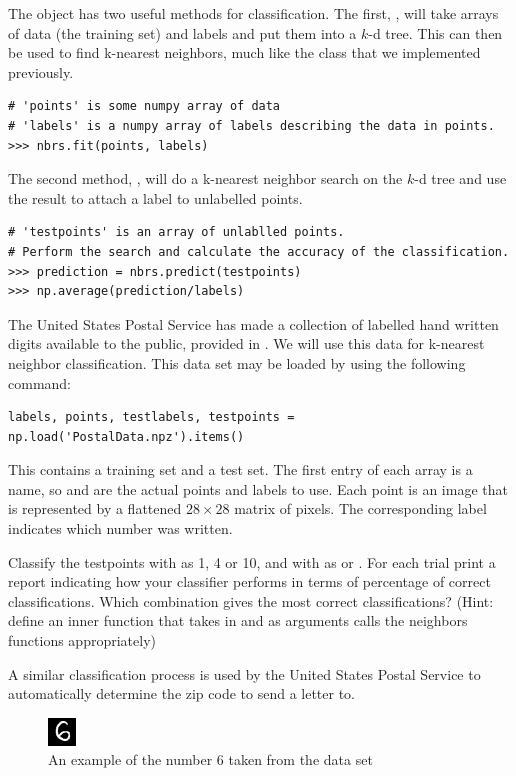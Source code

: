 The  object has two useful methods for classification.
The first, , will take arrays of data (the training set) and labels and put them into a $k$-d tree.
This can then be used to find k-nearest neighbors, much like the  class that we implemented previously.

\begin{lstlisting}
# 'points' is some numpy array of data
# 'labels' is a numpy array of labels describing the data in points.
>>> nbrs.fit(points, labels)
\end{lstlisting}

The second method, , will do a k-nearest neighbor search on the $k$-d tree and use the result to attach a label to unlabelled points.

\begin{lstlisting}
# 'testpoints' is an array of unlablled points.
# Perform the search and calculate the accuracy of the classification.
>>> prediction = nbrs.predict(testpoints)
>>> np.average(prediction/labels)
\end{lstlisting}

\begin{problem}
The United States Postal Service has made a collection of labelled hand written digits available to the public, provided in .
We will use this data for k-nearest neighbor classification.
This data set may be loaded by using the following command:
\begin{lstlisting}
labels, points, testlabels, testpoints = np.load('PostalData.npz').items()
\end{lstlisting}
This contains a training set and a test set.
The first entry of each array is a name, so  and  are the actual points and labels to use.
Each point is an image that is represented by a flattened $28 \times 28$ matrix of pixels. 
The corresponding label indicates which number was written.

Classify the testpoints with  as 1, 4 or 10, and with  as  or .
For each trial print a report indicating how your classifier performs in terms of percentage of correct classifications.
Which combination gives the most correct classifications?
(Hint: define an inner function that takes in  and  as arguments calls the neighbors functions appropriately)

A similar classification process is used by the United States Postal Service to automatically determine the zip code to send a letter to.

\begin{figure}[H]
\includegraphics[width=.25\textwidth]{Example.png}
\caption{An example of the number 6 taken from the data set}
\end{figure}
\end{problem}
